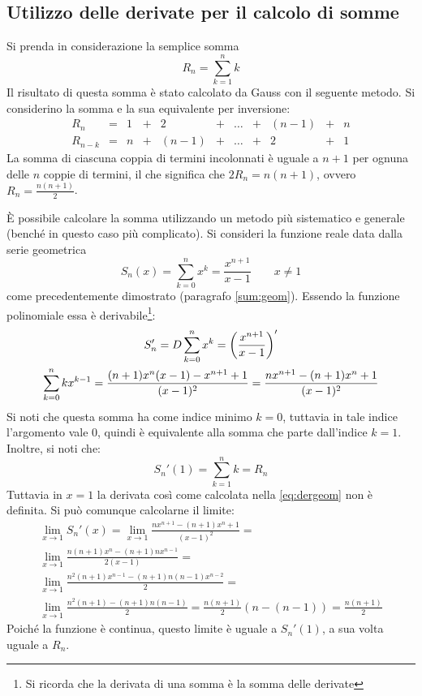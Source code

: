 \subsection[Somma tramite derivata]{Utilizzo delle derivate per il calcolo di somme}
Si prenda in considerazione la semplice somma
\[
	R_n=\sum_{k=1}^n k
\]
Il risultato di questa somma è stato calcolato da Gauss con il seguente metodo. Si considerino la somma e la sua equivalente per inversione:
\[
	\begin{array}{cccccccccccc}
		R_n     & = & 1 & + & 2     & + & \dots & + & (n-1) & + & n \\
		R_{n-k} & = & n & + & (n-1) & + & \dots & + & 2     & + & 1
	\end{array}
\]
La somma di ciascuna coppia di termini incolonnati è uguale a $n+1$ per ognuna delle $n$ coppie di termini, il che significa che $2R_n=n(n+1)$, ovvero $R_n=\frac{n(n+1)}{2}$.

È possibile calcolare la somma utilizzando un metodo più sistematico e generale (benché in questo caso più complicato). Si consideri la funzione reale data dalla serie geometrica
\[
	S_n(x)=\sum_{k=0}^n x^k=\frac{x^{n+1}}{x-1}\qquad{x\neq1}
\]
come precedentemente dimostrato (paragrafo \ref{sum:geom}). Essendo la funzione polinomiale essa è derivabile\footnote{Si ricorda che la derivata di una somma è la somma delle derivate}:
\begin{gather}
	S_n'=D\sum_{k=0}^n x^k = \left(\frac{x^{n+1}}{x-1}\right)'\notag\\
	\label{eq:dergeom}
	\sum_{k=0}^n kx^{k-1}=\frac{(n+1)x^n(x-1)-x^{n+1}+1}{(x-1)^2}=\frac{nx^{n+1}-(n+1)x^n+1}{(x-1)^2}
\end{gather}
Si noti che questa somma ha come indice minimo $k=0$, tuttavia in tale indice l'argomento vale $0$, quindi è equivalente alla somma che parte dall'indice $k=1$. Inoltre, si noti che:
\[
	S_n'(1)=\sum_{k=1}^n k=R_n
\]
Tuttavia in $x=1$ la derivata così come calcolata nella \ref{eq:dergeom} non è definita. Si può comunque calcolarne il limite:
\begin{gather*}
	\lim_{x\to1} S_n'(x)=\lim_{x\to1} \frac{nx^{n+1}-(n+1)x^n+1}{(x-1)^2}=\\[1ex]
	\lim_{x\to1} \frac{n(n+1)x^n-(n+1)nx^{n-1}}{2(x-1)}=\\[1ex]
	\lim_{x\to1} \frac{n^2(n+1)x^{n-1}-(n+1)n(n-1)x^{n-2}}{2}=\\[1ex]
	\lim_{x\to1} \frac{n^2(n+1)-(n+1)n(n-1)}{2}=\frac{n(n+1)}{2}(n-(n-1))=\frac{n(n+1)}{2}
\end{gather*}
Poiché la funzione è continua, questo limite è uguale a $S_n'(1)$, a sua volta uguale a $R_n$.

